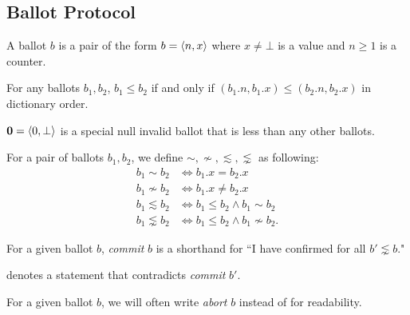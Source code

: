 \subsection{Ballot Protocol}

\begin{defn}[Ballot]
    A ballot $b$ is a pair of the form $b = \ev{n, x}$ where $x \ne \bot$ is a value and $n \geq 1$ is a counter.
\end{defn}

\begin{defn}[Order]
    For any ballots $b_1, b_2$, $b_1 \leq b_2$ if and only if $(b_1.n, b_1.x) \leq (b_2.n, b_2.x)$ in dictionary order.
\end{defn}

\begin{defn}
    $\textbf{0} = \ev{0, \bot}$ is a special null invalid ballot that is less than any other ballots.
\end{defn}

\begin{defn}[Compatability]
    For a pair of ballots $b_1, b_2$, we define $\sim, \nsim, \lesssim, \lnsim$ as following:
    \begin{align*}
        b_1 \sim b_2 &\iff b_1.x = b_2.x \\
        b_1 \nsim b_2 &\iff b_1.x \ne b_2.x \\
        b_1 \lesssim b_2 &\iff b_1 \leq b_2 \land b_1 \sim b_2 \\
        b_1 \lnsim b_2 &\iff b_1 \leq b_2 \land b_1 \nsim b_2.
    \end{align*}
\end{defn}

\begin{defn}[Commit]
    For a given ballot $b$, \textit{commit} $b$ is a shorthand for ``I have confirmed  for all $b' \lnsim b$."
\end{defn}

 denotes a statement that contradicts \textit{commit} $b'$.

\begin{rem}[Abort]
    For a given ballot $b$, we will often write \textit{abort} $b$ instead of  for readability.
\end{rem}

